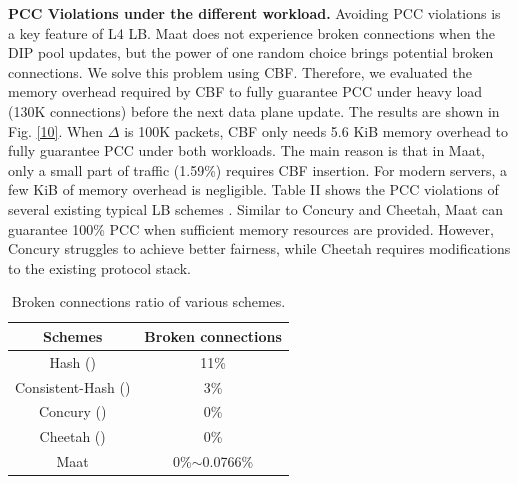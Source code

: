\textbf{PCC Violations under the different workload.} Avoiding PCC violations is a key feature of L4 LB. Maat does not experience broken connections when the DIP pool updates, but the power of one random choice brings potential broken connections. We solve this problem using CBF. Therefore, we evaluated the memory overhead required by CBF to fully guarantee PCC under heavy load (130K connections) before the next data plane update. The results are shown in Fig. \ref{10}. When $\Delta$ is 100K packets, CBF only needs 5.6 KiB memory overhead to fully guarantee PCC under both workloads. The main reason is that in Maat, only a small part of traffic (1.59\%) requires CBF insertion. For modern servers, a few KiB of memory overhead is negligible. Table II shows the PCC violations of several existing typical LB schemes \cite{barbette2021cheetah, shi2020concury}. Similar to Concury and Cheetah, Maat can guarantee 100\% PCC when sufficient memory resources are provided. However, Concury struggles to achieve better fairness, while Cheetah requires modifications to the existing protocol stack.

\begin{table}[htbp]
	\centering
	\caption{Broken connections ratio of various schemes.}
	\begin{tabular}{|c|c|} %
		\hline 
		Schemes&Broken connections\\
		\hline  
		Hash (\cite{patel2013ananta, gandhi2015rubik})&11\%\\
		\hline
		Consistent-Hash (\cite{eisenbud2016maglev})&3\%\\
		\hline
		Concury (\cite{shi2020concury})&0\%\\
		\hline
		Cheetah (\cite{barbette2021cheetah})&0\%\\
		\hline
		Maat&0\%$\sim$0.0766\%\\
		\hline
	\end{tabular}
	\label{1}
	\vspace{0em}
\end{table}

